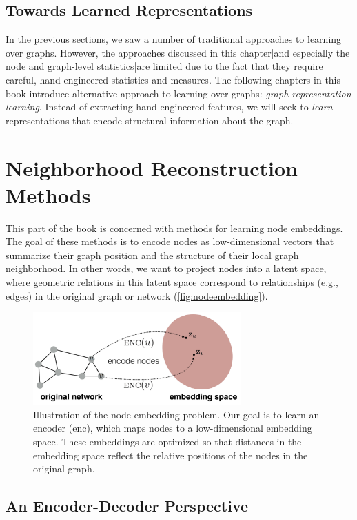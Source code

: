 \documentclass[10pt]{book}
\begin{document}
\subsection{Towards Learned Representations}

In the previous sections, we saw a number of traditional approaches to learning over graphs. However, the approaches discussed in
this chapter|and especially the node and graph-level statistics|are limited due to the fact that they require careful, hand-engineered statistics and measures.  The following chapters in this book introduce alternative approach to learning over graphs: \emph{graph representation learning}. Instead of extracting hand-engineered features, we will seek to \emph{learn} representations that encode structural information about the graph.


\section{Neighborhood Reconstruction Methods}

This part of the book is concerned with methods for learning node embeddings. The goal of these methods is to encode nodes as low-dimensional vectors that summarize their graph position and the structure of their local graph neighborhood. In other words, we want to project nodes into a latent space, where geometric relations in this latent space correspond to relationships (e.g., edges) in the original graph or network (\autoref{fig:nodeembedding}).

\begin{figure}[ht]
    \centering
    \includegraphics[width=8cm]{figures/Node_embedding.png}
    \caption{Illustration of the node embedding problem. Our goal is to learn an encoder (enc), which maps nodes to a low-dimensional embedding space. These embeddings are optimized so that distances in the embedding space reflect the relative positions of the nodes in the original graph.}
    \label{fig:nodeembedding}
\end{figure}

\subsection{An Encoder-Decoder Perspective}
\end{document}

